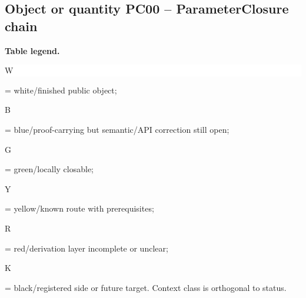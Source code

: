 \subsection*{Object or quantity PC00 -- ParameterClosure chain}
\hypertarget{objproof:PC00}{}
\par\smallskip\noindent\begin{minipage}{0.99\linewidth}\footnotesize\raggedright\textbf{Table legend.} \colorbox{white}{\strut W} = white/finished public object; \colorbox{cyan!20}{\strut B} = blue/proof-carrying but semantic/API correction still open; \colorbox{green!18}{\strut G} = green/locally closable; \colorbox{yellow!25}{\strut Y} = yellow/known route with prerequisites; \colorbox{red!20}{\strut R} = red/derivation layer incomplete or unclear; \colorbox{black!18}{\strut K} = black/registered side or future target. Context class is orthogonal to status.\end{minipage}\par\vspace{0.25em}
